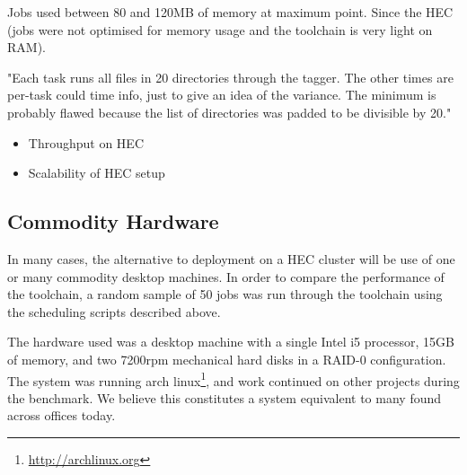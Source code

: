 Jobs used between 80 and 120MB of memory at maximum point.  Since the HEC  (jobs were not optimised for memory usage and the toolchain is very light on RAM).

"Each task runs all files in 20 directories through the tagger.  The other times are per-task could time info, just to give an idea of the variance.
The minimum is probably flawed because the list of directories was padded to be divisible by 20."

\begin{itemize}
    \item Throughput on HEC
    \item Scalability of HEC setup
\end{itemize}





\subsection{Commodity Hardware}
In many cases, the alternative to deployment on a HEC cluster will be use of one or many commodity desktop machines.  In order to compare the performance of the toolchain, a random sample of 50 jobs was run through the toolchain using the scheduling scripts described above.

The hardware used was a desktop machine with a single Intel i5 processor, 15GB of memory, and two 7200rpm mechanical hard disks in a RAID-0 configuration.  The system was running arch linux\footnote{\url{http://archlinux.org}}, and work continued on other projects during the benchmark.  We believe this constitutes a system equivalent to many found across offices today.

